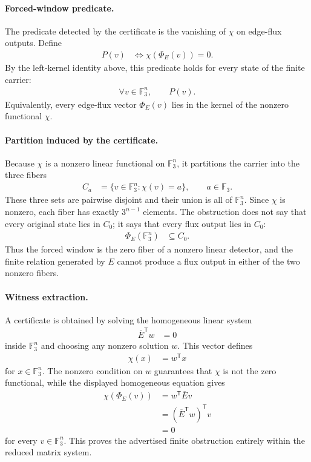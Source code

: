 \paragraph{Forced-window predicate.}
The predicate detected by the certificate is the vanishing of $\chi$ on edge-flux outputs. Define
$$
\begin{aligned}
P(v) &\Longleftrightarrow \chi(\Phi_E(v))=0.
\end{aligned}
$$
By the left-kernel identity above, this predicate holds for every state of the finite carrier:
$$
\begin{aligned}
\forall v\in \mathbb{F}_3^n,\qquad P(v).
\end{aligned}
$$
Equivalently, every edge-flux vector $\Phi_E(v)$ lies in the kernel of the nonzero functional $\chi$.

\paragraph{Partition induced by the certificate.}
Because $\chi$ is a nonzero linear functional on $\mathbb{F}_3^n$, it partitions the carrier into the three fibers
$$
\begin{aligned}
C_a &= \{v\in \mathbb{F}_3^n : \chi(v)=a\}, \qquad a\in \mathbb{F}_3.
\end{aligned}
$$
These three sets are pairwise disjoint and their union is all of $\mathbb{F}_3^n$. Since $\chi$ is nonzero, each fiber has exactly $3^{n-1}$ elements. The obstruction does not say that every original state lies in $C_0$; it says that every flux output lies in $C_0$:
$$
\begin{aligned}
\Phi_E(\mathbb{F}_3^n) &\subseteq C_0.
\end{aligned}
$$
Thus the forced window is the zero fiber of a nonzero linear detector, and the finite relation generated by $E$ cannot produce a flux output in either of the two nonzero fibers.

\paragraph{Witness extraction.}
A certificate is obtained by solving the homogeneous linear system
$$
\begin{aligned}
\overline{E}^{\mathsf{T}}w &= 0
\end{aligned}
$$
inside $\mathbb{F}_3^n$ and choosing any nonzero solution $w$. This vector defines
$$
\begin{aligned}
\chi(x) &= w^{\mathsf{T}}x
\end{aligned}
$$
for $x\in \mathbb{F}_3^n$. The nonzero condition on $w$ guarantees that $\chi$ is not the zero functional, while the displayed homogeneous equation gives
$$
\begin{aligned}
\chi(\Phi_E(v))
  &= w^{\mathsf{T}}\overline{E}v \\
  &= (\overline{E}^{\mathsf{T}}w)^{\mathsf{T}}v \\
  &= 0
\end{aligned}
$$
for every $v\in \mathbb{F}_3^n$. This proves the advertised finite obstruction entirely within the reduced matrix system.

